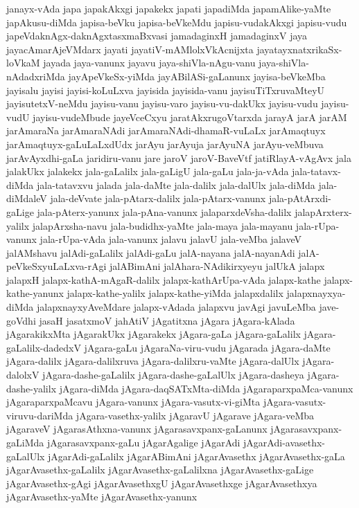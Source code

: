{janayx-vAda
japa
japakAkxgi
japakekx
japati
japadiMda
japamAlike-yaMte
japAkusu-diMda
japisa-beVku
japisa-beVkeMdu
japisu-vudakAkxgi
japisu-vudu
japeVdaknAgx-daknAgxtasxmaBxvasi
jamadaginxH
jamadaginxV
jaya
jayacAmarAjeVMdarx
jayati
jayatiV-mAMlolxVkAcnijxta
jayatayxnatxrikaSx-loVkaM
jayada
jaya-vanunx
jayavu
jaya-shiVla-nAgu-vanu
jaya-shiVla-nAdadxriMda
jayApeVkeSx-yiMda
jayABilASi-gaLanunx
jayisa-beVkeMba
jayisalu
jayisi
jayisi-koLuLxva
jayisida
jayisida-vanu
jayisuTiTxruvaMteyU
jayisutetxV-neMdu
jayisu-vanu
jayisu-varo
jayisu-vu-dakUkx
jayisu-vudu
jayisu-vudU
jayisu-vudeMbude
jayeVceCxyu
jaratAkxrugoVtarxda
jarayA
jarA
jarAM
jarAmaraNa
jarAmaraNAdi
jarAmaraNAdi-dhamaR-vuLaLx
jarAmaqtuyx
jarAmaqtuyx-gaLuLaLxdUdx
jarAyu
jarAyuja
jarAyuNA
jarAyu-veMbuva
jarAvAyxdhi-gaLa
jaridiru-vanu
jare
jaroV
jaroV-BaveVtf
jatiRlayA-vAgAvx
jala
jalakUkx
jalakekx
jala-gaLalilx
jala-gaLigU
jala-gaLu
jala-ja-vAda
jala-tatavx-diMda
jala-tatavxvu
jalada
jala-daMte
jala-dalilx
jala-dalUlx
jala-diMda
jala-diMdaleV
jala-deVvate
jala-pAtarx-dalilx
jala-pAtarx-vanunx
jala-pAtArxdi-gaLige
jala-pAterx-yanunx
jala-pAna-vanunx
jalaparxdeVsha-dalilx
jalapArxterx-yalilx
jalapArxsha-navu
jala-budidhx-yaMte
jala-maya
jala-mayanu
jala-rUpa-vanunx
jala-rUpa-vAda
jala-vanunx
jalavu
jalavU
jala-veMba
jalaveV
jalAMshavu
jalAdi-gaLalilx
jalAdi-gaLu
jalA-nayana
jalA-nayanAdi
jalA-peVkeSxyuLaLxva-rAgi
jalABimAni
jalAhara-NAdikirxyeyu
jalUkA
jalapx
jalapxH
jalapx-kathA-mAgaR-dalilx
jalapx-kathArUpa-vAda
jalapx-kathe
jalapx-kathe-yanunx
jalapx-kathe-yalilx
jalapx-kathe-yiMda
jalapxdalilx
jalapxnayxya-diMda
jalapxnayxyAveMdare
jalapx-vAdada
jalapxvu
javAgi
javuLeMba
jave-goVdhi
jasaH
jasatxmoV
jahAtiV
jAgatitxna
jAgara
jAgara-kAlada
jAgarakikxMta
jAgarakUkx
jAgarakekx
jAgara-gaLa
jAgara-gaLalilx
jAgara-gaLalilx-dadedxV
jAgara-gaLu
jAgaraNa-viru-vudu
jAgarada
jAgara-daMte
jAgara-dalilx
jAgara-dalilxruva
jAgara-dalilxru-vaMte
jAgara-dalUlx
jAgara-dalolxV
jAgara-dashe-gaLalilx
jAgara-dashe-gaLalUlx
jAgara-dasheya
jAgara-dashe-yalilx
jAgara-diMda
jAgara-daqSATxMta-diMda
jAgaraparxpaMca-vanunx
jAgaraparxpaMcavu
jAgara-vanunx
jAgara-vasutx-vi-giMta
jAgara-vasutx-viruvu-dariMda
jAgara-vasethx-yalilx
jAgaravU
jAgarave
jAgara-veMba
jAgaraveV
jAgarasAthxna-vanunx
jAgarasavxpanx-gaLanunx
jAgarasavxpanx-gaLiMda
jAgarasavxpanx-gaLu
jAgarAgalige
jAgarAdi
jAgarAdi-avasethx-gaLalUlx
jAgarAdi-gaLalilx
jAgarABimAni
jAgarAvasethx
jAgarAvasethx-gaLa
jAgarAvasethx-gaLalilx
jAgarAvasethx-gaLalilxna
jAgarAvasethx-gaLige
jAgarAvasethx-gAgi
jAgarAvasethxgU
jAgarAvasethxge
jAgarAvasethxya
jAgarAvasethx-yaMte
jAgarAvasethx-yanunx
}
